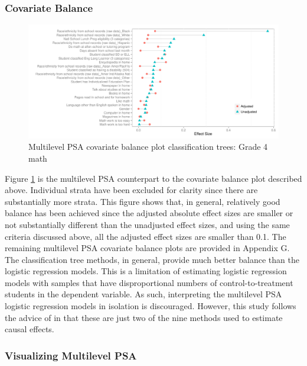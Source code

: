 \documentclass[letterpaper,12p,twoside]{article} %
\begin{document}
\subsubsection{Covariate Balance}

\begin{figure}[t]
\begin{center}
\includegraphics[width=\textwidth]{../Figures2009/g4math-mlpsa-ctree-balance.pdf}
\caption{Multilevel PSA covariate balance plot classification trees: Grade 4 math}
\label{fig:g4math-mlpsa-ctree-balance}
\end{center}
\end{figure}

Figure \ref{fig:g4math-mlpsa-ctree-balance} is the multilevel PSA counterpart to the covariate balance plot described above. Individual strata have been excluded for clarity since there are substantially more strata. This figure shows that, in general, relatively good balance has been achieved since the adjusted absolute effect sizes are smaller or not substantially different than the unadjusted effect sizes, and using the same criteria discussed above, all the adjusted effect sizes are smaller than 0.1. The remaining multilevel PSA covariate balance plots are provided in Appendix G. The classification tree methods, in general, provide much better balance than the logistic regression models. This is a limitation of estimating logistic regression models with samples that have disproportional numbers of control-to-treatment students in the dependent variable. As such, interpreting the multilevel PSA logistic regression models in isolation is discouraged. However, this study follows the advice of  in that these are just two of the nine methods used to estimate causal effects.

\subsubsection{Visualizing Multilevel PSA}
\end{document}
